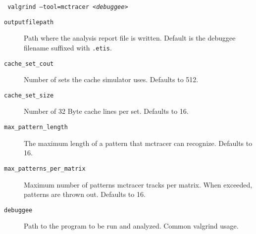 \texttt{
	valgrind --tool=mctracer \newline
	[--output=<\textit{outputfilepath}>] \newline
	[--cache-sets=<cache\_set\_cout>] \newline
	[--cache-set-size=<cache\_set\_size>] \newline
	[--max-pattern-length=<max\_pattern\_length>] \newline
	[--max-patterns-per-matrix=<max\_patterns\_per\_matrix>] \newline
	<\textit{debuggee}>
}
\begin{description}
\item[\texttt{outputfilepath}] Path where the analysis report file is written. Default is the debuggee filename suffixed with \texttt{.etis}.
\item[\texttt{cache\_set\_cout}] Number of sets the cache simulator uses. Defaults to 512.
\item[\texttt{cache\_set\_size}] Number of 32 Byte cache lines per set. Defaults to 16.
\item[\texttt{max\_pattern\_length}] The maximum length of a pattern that mctracer can recognize. Defaults to 16.
\item[\texttt{max\_patterns\_per\_matrix}] Maximum number of patterns mctracer tracks per matrix. When exceeded, patterns are thrown out. Defaults to 16.
\item[\texttt{debuggee}] Path to the program to be run and analyzed. Common valgrind usage.
\end{description}

